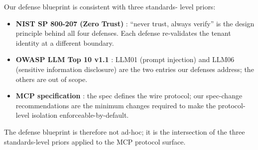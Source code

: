 Our defense blueprint is consistent with three standards-
level priors:

\begin{itemize}
  \item \textbf{NIST SP 800-207 (Zero Trust)}
        \cite{nist_sp_800_207}: ``never trust, always verify''
        is the design principle behind all four defenses.
        Each defense re-validates the tenant identity at a
        different boundary.
  \item \textbf{OWASP LLM Top 10 v1.1}
        \cite{owasp_llm_top10_v11}: LLM01 (prompt injection)
        and LLM06 (sensitive information disclosure) are the
        two entries our defenses address; the others are out
        of scope.
  \item \textbf{MCP specification}
        \cite{mcp_spec,anthropic_mcp_announce}: the spec
        defines the wire protocol; our spec-change
        recommendations are the minimum changes required
        to make the protocol-level isolation
        enforceable-by-default.
\end{itemize}

The defense blueprint is therefore not ad-hoc; it is the
intersection of the three standards-level priors applied
to the MCP protocol surface.